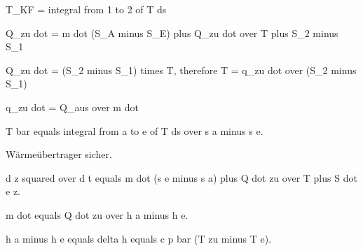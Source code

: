 T_KF = integral from 1 to 2 of T ds

Q_zu dot = m dot (S_A minus S_E) plus Q_zu dot over T plus S_2 minus S_1

Q_zu dot = (S_2 minus S_1) times T, therefore T = q_zu dot over (S_2 minus S_1)

q_zu dot = Q_aus over m dot

T bar equals integral from a to e of T ds over s a minus s e.

Wärmeübertrager sicher.

d z squared over d t equals m dot (s e minus s a) plus Q dot zu over T plus S dot e z.

m dot equals Q dot zu over h a minus h e.

h a minus h e equals delta h equals c p bar (T zu minus T e).